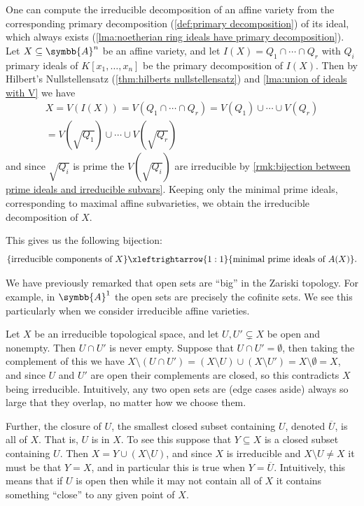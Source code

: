\documentclass[fleqn]{NotesClass}
\newcommand{\affine}{\symbb{A}}
\begin{document}
    \begin{remark}{}{}
        One can compute the irreducible decomposition of an affine variety from the corresponding primary decomposition (\cref{def:primary decomposition}) of its ideal, which always exists (\cref{lma:noetherian ring ideals have primary decomposition}).
        Let \(X \subseteq \affine^n\) be an affine variety, and let \(I(X) = Q_1 \cap \dotsb \cap Q_r\) with \(Q_i\) primary ideals of \(K[x_1, \dotsc, x_n]\) be the primary decomposition of \(I(X)\).
        Then by Hilbert's Nullstellensatz (\cref{thm:hilberts nullstellensatz}) and \cref{lma:union of ideals with V} we have
        \begin{multline}
            X = V(I(X)) = V(Q_1 \cap \dotsb \cap Q_r) = V(Q_1) \cup \dotsb \cup V(Q_r)\\
            = V(\sqrt{Q_1}) \cup \dotsb \cup V(\sqrt{Q_r})
        \end{multline}
        and since \(\sqrt{Q_i}\) is prime the \(V(\sqrt{Q_i})\) are irreducible by \cref{rmk:bijection between prime ideals and irreducible subvars}.
        Keeping only the minimal prime ideals, corresponding to maximal affine subvarieties, we obtain the irreducible decomposition of \(X\).
        
        This gives us the following bijection:
        \begin{equation}
            \{\text{irreducible components of }X\} \xleftrightarrow{1:1} \{\text{minimal prime ideals of } A(X)\}.
        \end{equation}
    \end{remark}
    
    We have previously remarked that open sets are \enquote{big} in the Zariski topology.
    For example, in \(\affine^1\) the open sets are precisely the cofinite sets.
    We see this particularly when we consider irreducible affine varieties.
    
    Let \(X\) be an irreducible topological space, and let \(U, U' \subsetneq X\) be open and nonempty.
    Then \(U \cap U'\) is never empty.
    Suppose that \(U \cap U' = \emptyset\), then taking the complement of this we have \(X \setminus (U \cap U') = (X \setminus U) \cup (X \setminus U') = X \setminus \emptyset = X\), and since \(U\) and \(U'\) are open their complements are closed, so this contradicts \(X\) being irreducible.
    Intuitively, any two open sets are (edge cases aside) always so large that they overlap, no matter how we choose them.
    
    Further, the closure of \(U\), the smallest closed subset containing \(U\), denoted \(\overline{U}\), is all of \(X\).
    That is, \(U\) is  in \(X\).
    To see this suppose that \(Y \subseteq X\) is a closed subset containing \(U\).
    Then \(X = Y \cup (X \setminus U)\), and since \(X\) is irreducible and \(X \setminus U \ne X\) it must be that \(Y = X\), and in particular this is true when \(Y = \overline{U}\).
    Intuitively, this means that if \(U\) is open then while it may not contain all of \(X\) it contains something \enquote{close} to any given point of \(X\).
    
\end{document}
